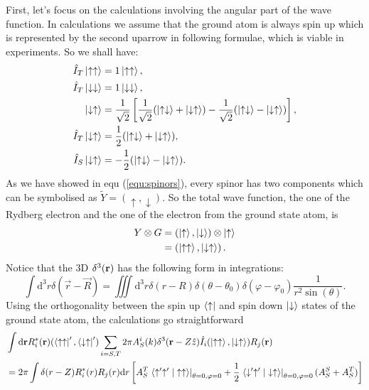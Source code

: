 \documentclass[british,english]{article}
\numberwithin{equation}{section}
\numberwithin{figure}{section}
\begin{document}
First, let's focus on the calculations involving the angular part of the wave function. In calculations we assume that the ground atom is always spin up which is represented by the second uparrow in following formulae, which is viable in experiments. So we shall have:
\begin{equation}
	\begin{aligned}
	\hat I_T\ket{\uparrow\uparrow}&=1\ket{\uparrow\uparrow},\\
	\hat I_T\ket{\downarrow\downarrow}&=1\ket{\downarrow\downarrow},\\
	\ket{\downarrow\uparrow}&=\frac{1}{\sqrt{2}}\left[\frac{1}{\sqrt{2}}(\ket{\uparrow\downarrow}+\ket{\downarrow\uparrow})-\frac{1}{\sqrt{2}}(\ket{\uparrow\downarrow}-\ket{\downarrow\uparrow})\right],\\
	\hat I_T\ket{\downarrow\uparrow}&=\frac{1}{2}(\ket{\uparrow\downarrow}+\ket{\downarrow\uparrow}),\\
	\hat I_S\ket{\downarrow\uparrow}&=-\frac{1}{2}(\ket{\uparrow\downarrow}-\ket{\downarrow\uparrow}).
	\end{aligned}
\end{equation}
As we have showed in equ (\ref{equ:spinors}), every spinor has two components which can be symbolised as $\tilde Y=(\uparrow,\downarrow)$. So the total wave function, the one of the Rydberg electron and the one of the electron from the ground state atom, is
\begin{equation} 
\begin{aligned}
Y\otimes G&=(\ket{\uparrow},\ket{\downarrow})\otimes \ket{\uparrow}\\
	  &=\left(\ket{\uparrow\uparrow},\ket{\downarrow\uparrow}\right).
\end{aligned}
\end{equation}
Notice that the 3D $\delta^3({\bf r})$ has the following form in integrations:
\begin{equation}
\int \mathrm d^3 r \delta(\vec r -\vec R)=\iiint\mathrm d^3 r\delta(r-R)\delta(\theta-\theta_0)\delta(\varphi-\varphi_0)\frac{1}{r^2\sin(\theta)}.
\end{equation}
Using the orthogonality between the spin up $\bra{\uparrow}$ and spin down $\ket{\downarrow}$ states of the ground state atom, the calculations go straightforward
\begin{equation}
\begin{aligned}
&\int \mathrm d {\bf r}R^*_i({\bf r})(\bra{\uparrow\uparrow}',\bra{\downarrow\uparrow}')\sum_{i=S,T}2\pi A^i_S(k)\delta^3({\bf r}-Z\hat z)\hat I_i(\ket{\uparrow\uparrow},\ket{\downarrow\uparrow})R_j({\bf r})\\
&=2\pi \int \delta(r-Z) R^*_i(r)R_j(r)\mathrm d r\left[A_S^T\left.\braket{\uparrow'\uparrow'|\uparrow\uparrow}\right|_{\theta=0,\varphi=0}+\frac 12 \left.\braket{\downarrow'\uparrow'|\downarrow\uparrow}\right|_{\theta=0,\varphi=0}(A_S^S+A_S^T)\right]
\end{aligned}
\label{equ:angularS}
\end{equation}
\end{document}
